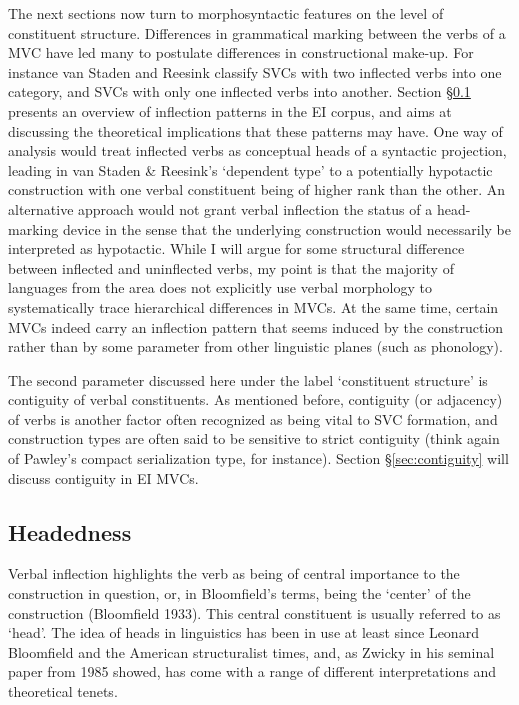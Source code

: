 The next sections now turn to morphosyntactic features on the level of constituent structure. Differences in grammatical marking between the verbs of a MVC have led many to postulate differences in constructional make-up. For instance van Staden and Reesink classify SVCs with two inflected verbs into one category, and SVCs with only one inflected verbs into another. Section §\ref{sec:headedness} presents an overview of inflection patterns in the EI corpus, and aims at discussing the theoretical implications that these patterns may have. One way of analysis would treat inflected verbs as conceptual heads of a syntactic projection, leading in van Staden \& Reesink's `dependent type' to a potentially hypotactic construction with one verbal constituent being of higher rank than the other. An alternative approach would not grant verbal inflection the status of a head-marking device in the sense that the underlying construction would necessarily be interpreted as hypotactic. While I will argue for some structural difference between inflected and uninflected verbs, my point is that the majority of languages from the area does not explicitly use verbal morphology to systematically trace hierarchical differences in MVCs. At the same time, certain MVCs indeed carry an inflection pattern that seems induced by the construction rather than by some parameter from other linguistic planes (such as phonology).

The second parameter discussed here under the label `constituent structure' is contiguity of verbal constituents. As mentioned before, contiguity (or adjacency) of verbs is another factor often recognized as being vital to SVC formation, and construction types are often said to be sensitive to strict contiguity (think again of Pawley's compact serialization type, for instance). Section §\ref{sec:contiguity} will discuss contiguity in EI MVCs.

\subsection{Headedness}\label{sec:headedness}

Verbal inflection highlights the verb as being of central importance to the construction in question, or, in Bloomfield's terms, being the `center' of the construction (Bloomfield 1933). This central constituent is usually referred to as `head'. The idea of heads in linguistics has been in use at least since Leonard Bloomfield and the American structuralist times, and, as Zwicky in his seminal paper from 1985 showed, has come with a range of different interpretations and theoretical tenets. 

